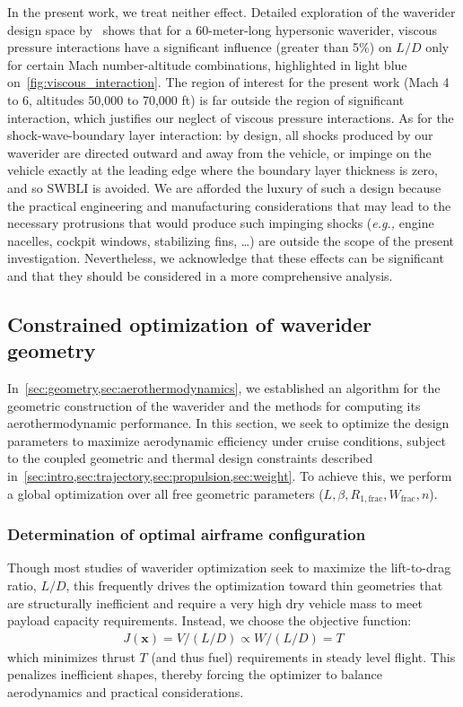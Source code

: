 \documentclass[10pt,a4paper]{article}
\begin{document}
In the present work, we treat neither effect. Detailed exploration of the waverider design space by~\citep{Anderson:1992} shows that for a 60-meter-long hypersonic waverider, viscous pressure interactions have a significant influence (greater than 5\%) on $L/D$ only for certain Mach number-altitude combinations, highlighted in light blue on~\cref{fig:viscous_interaction}. The region of interest for the present work (Mach 4 to 6, altitudes 50,000 to 70,000 ft) is far outside the region of significant interaction, which justifies our neglect of viscous pressure interactions. As for the shock-wave-boundary layer interaction: by design, all shocks produced by our waverider are directed outward and away from the vehicle, or impinge on the vehicle exactly at the leading edge where the boundary layer thickness is zero, and so SWBLI is avoided. We are afforded the luxury of such a design because the practical engineering and manufacturing considerations that may lead to the necessary protrusions that would produce such impinging shocks (\textit{e.g.,} engine nacelles, cockpit windows, stabilizing fins, \ldots) are outside the scope of the present investigation. Nevertheless, we acknowledge that these effects can be significant and that they should be considered in a more comprehensive analysis.

\subsection{Constrained optimization of waverider geometry}\label{sec:optimization}
In~\cref{sec:geometry,sec:aerothermodynamics}, we established an algorithm for the geometric construction of the waverider and the methods for computing its aerothermodynamic performance. In this section, we seek to optimize the design parameters to maximize aerodynamic efficiency under cruise conditions, subject to the coupled geometric and thermal design constraints described in~\cref{sec:intro,sec:trajectory,sec:propulsion,sec:weight}. To achieve this, we perform a global optimization over all free geometric parameters ($L,\beta,R_{1,\text{frac}},W_{\text{frac}},n$).

\subsubsection{Determination of optimal airframe configuration}
Though most studies of waverider optimization seek to maximize the lift-to-drag ratio, $L/D$, this frequently drives the optimization toward thin geometries that are structurally inefficient and require a very high dry vehicle mass to meet payload capacity requirements. Instead, we choose the objective function:
\begin{gather}
    J(\mathbf{x})=V/(L/D)\propto W/(L/D)=T
\end{gather}
which minimizes thrust $T$ (and thus fuel) requirements in steady level flight. This penalizes inefficient shapes, thereby forcing the optimizer to balance aerodynamics and practical considerations.
\end{document}
